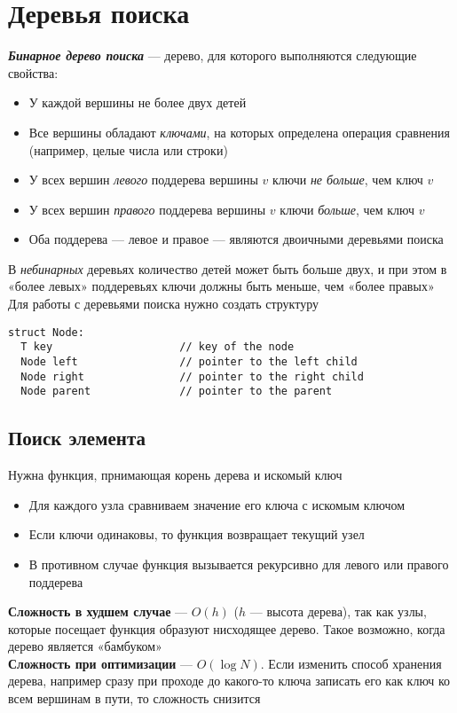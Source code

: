 \documentclass[a4paper]{article}
\begin{document}
\section{Деревья поиска}
\textbf{\textit{Бинарное дерево поиска}} — дерево, для которого выполняются следующие свойства:
\begin{itemize}
\item У каждой вершины не более двух детей
\item Все вершины обладают \textit{ключами}, на которых определена операция сравнения (например, целые числа или строки)
\item У всех вершин \textit{левого} поддерева вершины $v$ ключи \textit{не больше}, чем ключ $v$
\item У всех вершин \textit{правого} поддерева вершины $v$ ключи \textit{больше}, чем ключ $v$
\item Оба поддерева — левое и правое — являются двоичными деревьями поиска
\end{itemize}
В \textit{небинарных} деревьях количество детей может быть больше двух, и при этом в «более левых» поддеревьях ключи должны быть меньше, чем «более правых»\\[2mm]
\indent Для работы с деревьями поиска нужно создать структуру
\begin{lstlisting}
struct Node:
  T key                    // key of the node
  Node left                // pointer to the left child
  Node right               // pointer to the right child
  Node parent              // pointer to the parent
\end{lstlisting}
\subsection{Поиск элемента}
Нужна функция, прнимающая корень дерева и искомый ключ
\begin{itemize}
    \item Для каждого узла сравниваем значение его ключа с искомым ключом
    \item Если ключи одинаковы, то функция возвращает текущий узел
    \item В противном случае функция вызывается рекурсивно для левого или правого поддерева
\end{itemize}
\textbf{Сложность в худшем случае} — $O(h)$ ($h$ — высота дерева), так как узлы, которые посещает функция образуют нисходящее дерево. Такое возможно, когда дерево является «бамбуком»\\[2mm]
\textbf{Сложность при оптимизации} — $O(\log N)$. Если изменить способ хранения дерева, например сразу при проходе до какого-то ключа записать его как ключ ко всем вершинам в пути, то сложность снизится
\end{document}
